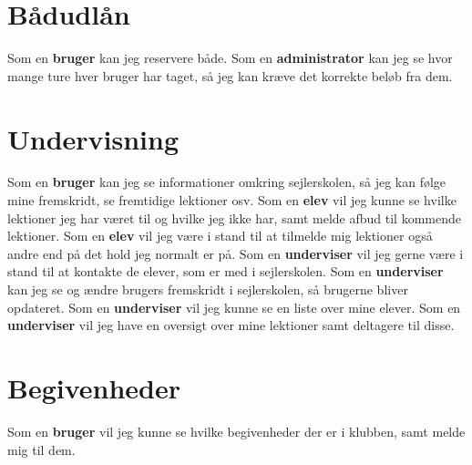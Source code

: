 \section{Bådudlån}

Som en \textbf{bruger} kan jeg reservere både.
\newline
Som en \textbf{administrator} kan jeg se hvor mange ture hver bruger har taget, så jeg kan kræve det korrekte beløb fra dem.

\section{Undervisning}
Som en \textbf{bruger} kan jeg se informationer omkring sejlerskolen, så jeg kan følge mine fremskridt, se fremtidige lektioner osv. 
\newline
Som en \textbf{elev} vil jeg kunne se hvilke lektioner jeg har været til og hvilke jeg ikke har, samt melde afbud til kommende lektioner.
\newline
Som en \textbf{elev} vil jeg være i stand til at tilmelde mig lektioner også andre end på det hold jeg normalt er på.
\newline
Som en \textbf{underviser} vil jeg gerne være i stand til at kontakte de elever, som er med i sejlerskolen.
\newline
Som en \textbf{underviser} kan jeg se og ændre brugers fremskridt i sejlerskolen, så brugerne bliver opdateret.
\newline
Som en \textbf{underviser} vil jeg kunne se en liste over mine elever.
\newline
Som en \textbf{underviser} vil jeg have en oversigt over mine lektioner samt deltagere til disse.

\section{Begivenheder}
Som en \textbf{bruger} vil jeg kunne se hvilke begivenheder der er i klubben, samt melde mig til dem.

